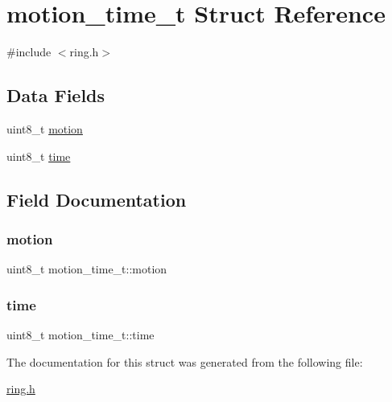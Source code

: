 \hypertarget{structmotion__time__t}{}\section{motion\+\_\+time\+\_\+t Struct Reference}
\label{structmotion__time__t}


{\ttfamily \#include $<$ring.\+h$>$}

\subsection*{Data Fields}
\begin{DoxyCompactItemize}
\item 
uint8\+\_\+t \hyperlink{structmotion__time__t_a32f90b7c0775800cee3056b3adca2040}{motion}
\item 
uint8\+\_\+t \hyperlink{structmotion__time__t_ae85eb141921db45d916cc792306475c9}{time}
\end{DoxyCompactItemize}


\subsection{Field Documentation}
\mbox{\label{structmotion__time__t_a32f90b7c0775800cee3056b3adca2040}} 
\subsubsection{\texorpdfstring{motion}{motion}}
{\footnotesize\ttfamily uint8\+\_\+t motion\+\_\+time\+\_\+t\+::motion}

\mbox{\label{structmotion__time__t_ae85eb141921db45d916cc792306475c9}} 
\subsubsection{\texorpdfstring{time}{time}}
{\footnotesize\ttfamily uint8\+\_\+t motion\+\_\+time\+\_\+t\+::time}



The documentation for this struct was generated from the following file\+:\begin{DoxyCompactItemize}
\item 
\hyperlink{ring_8h}{ring.\+h}\end{DoxyCompactItemize}
